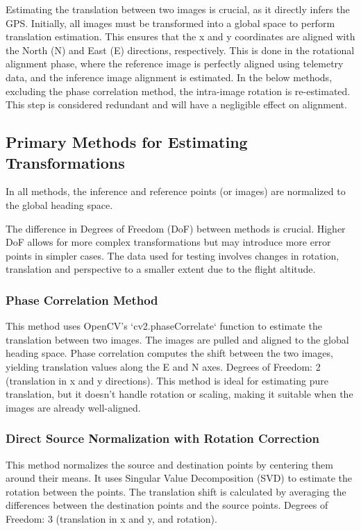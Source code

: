 Estimating the translation between two images is crucial, as it directly infers the GPS. Initially, all images must be transformed into a global space to perform translation estimation. This ensures that the x and y coordinates are aligned with the North (N) and East (E) directions, respectively. This is done in the rotational alignment phase, where the reference image is perfectly aligned using telemetry data, and the inference image alignment is estimated. In the below methods, excluding the phase correlation method, the intra-image rotation is re-estimated. This step is considered redundant and will have a negligible effect on alignment. 

\subsection*{Primary Methods for Estimating Transformations}
In all methods, the inference and reference points (or images) are normalized to the global heading space. 

The difference in Degrees of Freedom (DoF) between methods is crucial. Higher DoF allows for more complex transformations but may introduce more error points in simpler cases. The data used for testing involves changes in rotation, translation and perspective to a smaller extent due to the flight altitude. 

\subsubsection*{Phase Correlation Method}
This method uses OpenCV's `cv2.phaseCorrelate` function to estimate the translation between two images. The images are pulled and aligned to the global heading space. Phase correlation computes the shift between the two images, yielding translation values along the E and N axes.  
Degrees of Freedom: 2 (translation in x and y directions). This method is ideal for estimating pure translation, but it doesn't handle rotation or scaling, making it suitable when the images are already well-aligned.

\subsubsection*{Direct Source Normalization with Rotation Correction}
This method normalizes the source and destination points by centering them around their means. It uses Singular Value Decomposition (SVD) to estimate the rotation between the points. The translation shift is calculated by averaging the differences between the destination points and the source points.  
Degrees of Freedom: 3 (translation in x and y, and rotation). 

